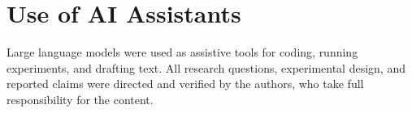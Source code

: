 \documentclass[11pt]{article}
\begin{document}
\section*{Use of AI Assistants}

Large language models were used as assistive tools for coding,
running experiments, and drafting text. All research questions,
experimental design, and reported claims were directed and verified by
the authors, who take full responsibility for the content.



\end{document}
